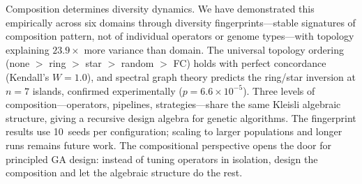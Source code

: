 \documentclass[dvipsnames,format=sigconf,anonymous=false,review=false]{acmart}
\begin{document}
Composition determines diversity dynamics. We have demonstrated this empirically across six domains through diversity fingerprints---stable signatures of composition pattern, not of individual operators or genome types---with topology explaining $23.9\times$ more variance than domain. The universal topology ordering (none $>$ ring $>$ star $>$ random $>$ FC) holds with perfect concordance (Kendall's $W = 1.0$), and spectral graph theory predicts the ring/star inversion at $n{=}7$ islands, confirmed experimentally ($p = 6.6 \times 10^{-5}$). Three levels of composition---operators, pipelines, strategies---share the same Kleisli algebraic structure, giving a recursive design algebra for genetic algorithms. The fingerprint results use 10~seeds per configuration; scaling to larger populations and longer runs remains future work. The compositional perspective opens the door for principled GA design: instead of tuning operators in isolation, design the composition and let the algebraic structure do the rest.



\end{document}
